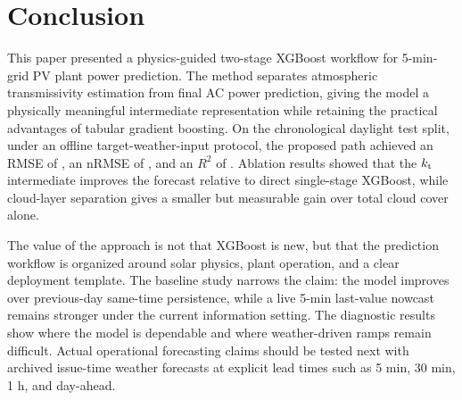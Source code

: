 \section{Conclusion}
\label{sec:conclusion}

This paper presented a physics-guided two-stage XGBoost workflow for 5-min-grid PV plant power prediction. The method separates atmospheric transmissivity estimation from final AC power prediction, giving the model a physically meaningful intermediate representation while retaining the practical advantages of tabular gradient boosting. On the chronological daylight test split, under an offline target-weather-input protocol, the proposed path achieved an RMSE of \RMSEproposed{}, an nRMSE of \NRMSEproposed{}, and an $R^2$ of \RtwoProposed{}. Ablation results showed that the $k_{\mathrm{t}}$ intermediate improves the forecast relative to direct single-stage XGBoost, while cloud-layer separation gives a smaller but measurable gain over total cloud cover alone.

The value of the approach is not that XGBoost is new, but that the prediction workflow is organized around solar physics, plant operation, and a clear deployment template. The baseline study narrows the claim: the model improves over previous-day same-time persistence, while a live 5-min last-value nowcast remains stronger under the current information setting. The diagnostic results show where the model is dependable and where weather-driven ramps remain difficult. Actual operational forecasting claims should be tested next with archived issue-time weather forecasts at explicit lead times such as 5 min, 30 min, 1 h, and day-ahead.
